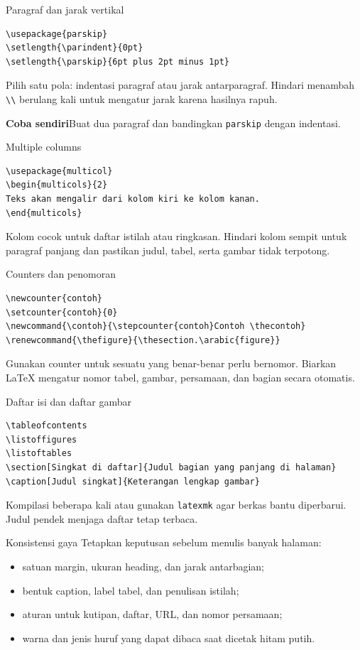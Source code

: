 \documentclass[aspectratio=169,11pt]{beamer}
\newcommand{\tugas}[1]{\par\medskip\alert{\textbf{Coba sendiri}}\quad #1}
\begin{document}
\begin{frame}[fragile]{Paragraf dan jarak vertikal}
\begin{lstlisting}
\usepackage{parskip}
\setlength{\parindent}{0pt}
\setlength{\parskip}{6pt plus 2pt minus 1pt}
\end{lstlisting}
Pilih satu pola: indentasi paragraf atau jarak antarparagraf. Hindari menambah
\lstinline|\\| berulang kali untuk mengatur jarak karena hasilnya rapuh.
\tugas{Buat dua paragraf dan bandingkan \texttt{parskip} dengan indentasi.}
\end{frame}
\begin{frame}[fragile]{Multiple columns}
\begin{lstlisting}
\usepackage{multicol}
\begin{multicols}{2}
Teks akan mengalir dari kolom kiri ke kolom kanan.
\end{multicols}
\end{lstlisting}
Kolom cocok untuk daftar istilah atau ringkasan. Hindari kolom sempit untuk
paragraf panjang dan pastikan judul, tabel, serta gambar tidak terpotong.
\end{frame}
\begin{frame}[fragile]{Counters dan penomoran}
\begin{lstlisting}
\newcounter{contoh}
\setcounter{contoh}{0}
\newcommand{\contoh}{\stepcounter{contoh}Contoh \thecontoh}
\renewcommand{\thefigure}{\thesection.\arabic{figure}}
\end{lstlisting}
Gunakan counter untuk sesuatu yang benar-benar perlu bernomor. Biarkan LaTeX
mengatur nomor tabel, gambar, persamaan, dan bagian secara otomatis.
\end{frame}
\begin{frame}[fragile]{Daftar isi dan daftar gambar}
\begin{lstlisting}
\tableofcontents
\listoffigures
\listoftables
\section[Singkat di daftar]{Judul bagian yang panjang di halaman}
\caption[Judul singkat]{Keterangan lengkap gambar}
\end{lstlisting}
Kompilasi beberapa kali atau gunakan \texttt{latexmk} agar berkas bantu diperbarui.
Judul pendek menjaga daftar tetap terbaca.
\end{frame}
\begin{frame}{Konsistensi gaya}
Tetapkan keputusan sebelum menulis banyak halaman:
\begin{itemize}
\item satuan margin, ukuran heading, dan jarak antarbagian;
\item bentuk caption, label tabel, dan penulisan istilah;
\item aturan untuk kutipan, daftar, URL, dan nomor persamaan;
\item warna dan jenis huruf yang dapat dibaca saat dicetak hitam putih.
\end{itemize}
\end{frame}
\end{document}
